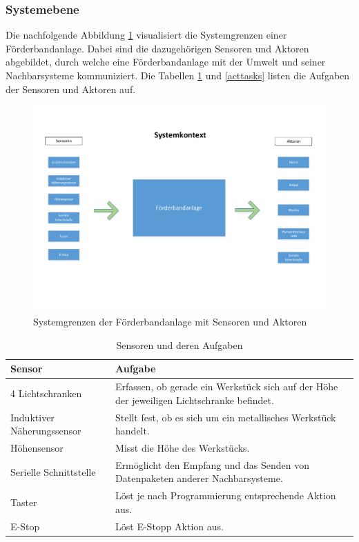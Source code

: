 \documentclass[a4paper, 11pt]{article}
\begin{document}
\newpage

\subsubsection{Systemebene}
Die nachfolgende Abbildung \ref{syskont} visualisiert die Systemgrenzen einer Förderbandanlage. Dabei sind die dazugehörigen Sensoren und Aktoren abgebildet, durch welche eine Förderbandanlage mit der Umwelt und seiner Nachbarsysteme kommuniziert. Die Tabellen \ref{senstasks} und \ref{acttasks} listen die Aufgaben der Sensoren und Aktoren auf.

\begin{figure}[H]
    \hspace{-1.2cm}
    \includegraphics[scale=0.6]{images/Systemkontext.pdf}
    \caption{Systemgrenzen der Förderbandanlage mit Sensoren und Aktoren}
    \label{syskont}
\end{figure}

\begin{table}[H]
\center
    \begin{tabularx}{\textwidth}{|l|X|}
    \hline
    \textbf{Sensor}&\textbf{Aufgabe}\\
    \hline
    4 Lichtschranken&Erfassen, ob gerade ein Werkstück sich auf der Höhe der jeweiligen Lichtschranke befindet.\\
    \hline
    Induktiver Näherungssensor&Stellt fest, ob es sich um ein metallisches Werkstück handelt.\\
    \hline
    Höhensensor&Misst die Höhe des Werkstücks.\\
    \hline
    Serielle Schnittstelle&Ermöglicht den Empfang und das Senden von Datenpaketen anderer Nachbarsysteme.\\
    \hline
    Taster&Löst je nach Programmierung entsprechende Aktion aus.\\
    \hline
    E-Stop&Löst E-Stopp Aktion aus.\\
    \hline
    \end{tabularx}
    \caption{Sensoren und deren Aufgaben}
    \label{senstasks}
\end{table}
\end{document}
